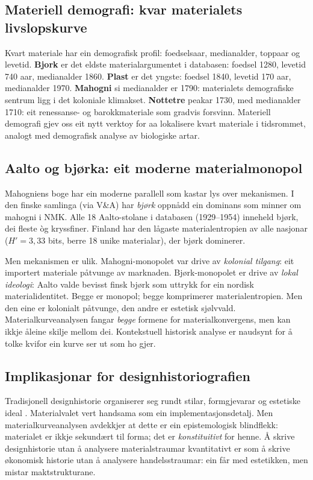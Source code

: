 \documentclass[10pt, a4paper, twocolumn]{article}
\begin{document}
\subsection{Materiell demografi: kvar materialets livslopskurve}

Kvart materiale har ein demografisk profil: foedselsaar, medianalder, toppaar og levetid. \textbf{Bjork} er det eldste materialargumentet i databasen: foedsel 1280, levetid 740 aar, medianalder 1860. \textbf{Plast} er det yngste: foedsel 1840, levetid 170 aar, medianalder 1970. \textbf{Mahogni} si medianalder er 1790: materialets demografiske sentrum ligg i det koloniale klimakset. \textbf{Nottetre} peakar 1730, med medianalder 1710: eit renessanse- og barokkmateriale som gradvis forsvinn. Materiell demografi gjev oss eit nytt verktoy for aa lokalisere kvart materiale i tidsrommet, analogt med demografisk analyse av biologiske artar.

\subsection{Aalto og bjørka: eit moderne materialmonopol}

Mahogniens boge har ein moderne parallell som kastar lys over mekanismen. I den finske samlinga (via V\&A) har \emph{bjørk} oppnådd ein dominans som minner om mahogni i NMK. Alle 18 Aalto-stolane i databasen (1929--1954) inneheld bjørk, dei fleste òg kryssfiner. Finland har den lågaste materialentropien av alle nasjonar ($H' = 3{,}33$ bits, berre 18 unike materialar), der bjørk dominerer.

Men mekanismen er ulik. Mahogni-monopolet var drive av \emph{kolonial tilgang}: eit importert materiale påtvunge av marknaden. Bjørk-monopolet er drive av \emph{lokal ideologi}: Aalto valde bevisst finsk bjørk som uttrykk for ein nordisk materialidentitet. Begge er monopol; begge komprimerer materialentropien. Men den eine er kolonialt påtvunge, den andre er estetisk sjølvvald. Materialkurveanalysen fangar \emph{begge} formene for materialkonvergens, men kan ikkje åleine skilje mellom dei. Kontekstuell historisk analyse er naudsynt for å tolke kvifor ein kurve ser ut som ho gjer.

\subsection{Implikasjonar for designhistoriografien}

Tradisjonell designhistorie organiserer seg rundt stilar, formgjevarar og estetiske ideal \citep{lucie-smith1993, raizman2010}. Materialvalet vert handsama som ein implementasjonsdetalj. Men materialkurveanalysen avdekkjer at dette er ein epistemologisk blindflekk: materialet er ikkje sekundært til forma; det er \emph{konstituitivt} for henne. Å skrive designhistorie utan å analysere materialstraumar kvantitativt er som å skrive økonomisk historie utan å analysere handelsstraumar: ein får med estetikken, men mistar maktstrukturane.
\end{document}
